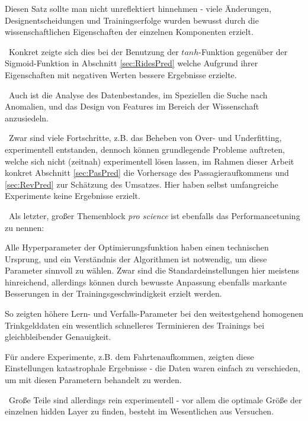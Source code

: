 Diesen Satz sollte man nicht unreflektiert hinnehmen - viele Änderungen, Designentscheidungen und Trainingserfolge wurden bewusst durch die wissenschaftlichen Eigenschaften der einzelnen Komponenten erzielt. 

~\newline  Konkret zeigte sich dies bei der Benutzung der $tanh$-Funktion gegenüber der Sigmoid-Funktion in Abschnitt \ref{sec:RidesPred} welche Aufgrund ihrer Eigenschaften mit negativen Werten bessere Ergebnisse erzielte. 

~\newline Auch ist die Analyse des Datenbestandes, im Speziellen die Suche nach Anomalien, und das Design von Features im Bereich der Wissenschaft anzusiedeln. 

~\newline Zwar sind viele Fortschritte, z.B. das Beheben von Over- und Underfitting, experimentell entstanden, dennoch können 
grundlegende Probleme auftreten, welche sich nicht (zeitnah) experimentell lösen lassen, im Rahmen dieser Arbeit konkret Abschnitt \ref{sec:PasPred} die Vorhersage des Passagieraufkommens und \ref{sec:RevPred} zur Schätzung des Umsatzes. Hier haben selbst umfangreiche Experimente keine Ergebnisse erzielt.

~\newline  Als letzter, großer Themenblock \textit{pro science} ist ebenfalls das Performancetuning zu nennen: 

Alle Hyperparameter der Optimierungsfunktion haben einen technischen Ursprung, und ein Verständnis der Algorithmen ist notwendig, um diese Parameter sinnvoll zu wählen. Zwar sind die Standardeinstellungen hier meistens hinreichend, allerdings können durch bewusste Anpassung ebenfalls markante Besserungen in der Trainingsgeschwindigkeit erzielt werden. 

So zeigten höhere Lern- und Verfalls-Parameter bei den weitestgehend homogenen Trinkgelddaten ein wesentlich schnelleres Terminieren des Trainings bei gleichbleibender Genauigkeit. 

Für andere Experimente, z.B. dem Fahrtenaufkommen, zeigten diese Einstellungen katastrophale Ergebnisse - die Daten waren einfach zu verschieden, um mit diesen Parametern behandelt zu werden. 

~\newline Große Teile sind allerdings rein experimentell - vor allem die optimale Größe der einzelnen hidden Layer zu finden, besteht im Wesentlichen aus Versuchen.


